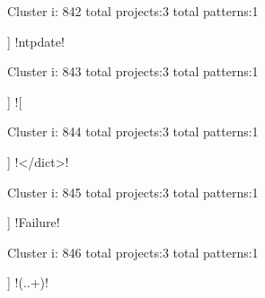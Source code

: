 Cluster i: 842
total projects:3
total patterns:1
\begin{multicols}{1}
\begin{description}[noitemsep,topsep=0pt]
\item [[3] ] \cverb!ntpdate!
\end{description}
\end{multicols}







Cluster i: 843
total projects:3
total patterns:1
\begin{multicols}{1}
\begin{description}[noitemsep,topsep=0pt]
\item [[3] ] \cverb![%
\end{description}
\end{multicols}







Cluster i: 844
total projects:3
total patterns:1
\begin{multicols}{1}
\begin{description}[noitemsep,topsep=0pt]
\item [[3] ] \cverb!</dict>!
\end{description}
\end{multicols}







Cluster i: 845
total projects:3
total patterns:1
\begin{multicols}{1}
\begin{description}[noitemsep,topsep=0pt]
\item [[3] ] \cverb!Failure!
\end{description}
\end{multicols}







Cluster i: 846
total projects:3
total patterns:1
\begin{multicols}{1}
\begin{description}[noitemsep,topsep=0pt]
\item [[3] ] \cverb!{(..+)}!
\end{description}
\end{multicols}








